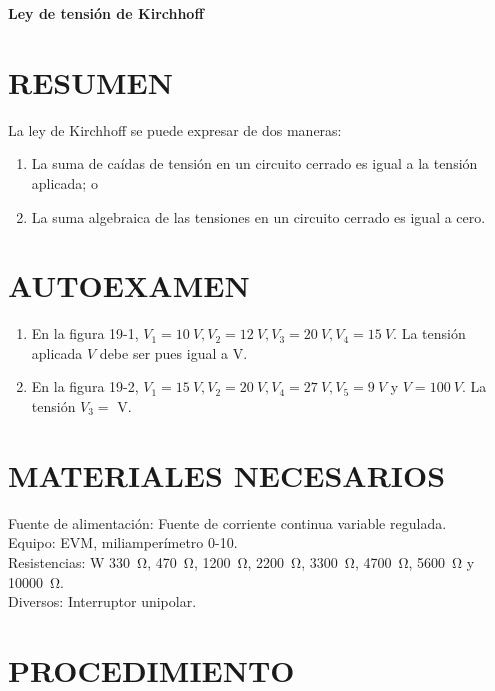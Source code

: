 \documentclass{article}
\begin{document}
\begin{center}
    \large\textbf{Ley de tensión de Kirchhoff}
\end{center}

\vspace{0.5cm}

\section*{RESUMEN}
La ley de Kirchhoff se puede expresar de dos maneras:
\begin{enumerate}
    \item La suma de caídas de tensión en un circuito cerrado es igual a la tensión aplicada; o
    \item La suma algebraica de las tensiones en un circuito cerrado es igual a cero.
\end{enumerate}

\section*{AUTOEXAMEN}
\begin{enumerate}
    \item En la figura 19-1, $V_1 = \SI{10}{V}, V_2 = \SI{12}{V}, V_3 = \SI{20}{V}, V_4 = \SI{15}{V}$. La tensión aplicada $V$ debe ser pues igual a \dotfill{} V.
    \item En la figura 19-2, $V_1 = \SI{15}{V}, V_2 = \SI{20}{V}, V_4 = \SI{27}{V}, V_5 = \SI{9}{V}$ y $V = \SI{100}{V}$. La tensión $V_3 = $ \dotfill{} V.
\end{enumerate}

\section*{MATERIALES NECESARIOS}
Fuente de alimentación: Fuente de corriente continua variable regulada. \\
Equipo: EVM, miliamperímetro 0-10. \\
Resistencias: \textonehalf{} W \SI{330}{\ohm}, \SI{470}{\ohm}, \SI{1200}{\ohm}, \SI{2200}{\ohm}, \SI{3300}{\ohm}, \SI{4700}{\ohm}, \SI{5600}{\ohm} y \SI{10000}{\ohm}. \\
Diversos: Interruptor unipolar.

\section*{PROCEDIMIENTO}
\end{document}
